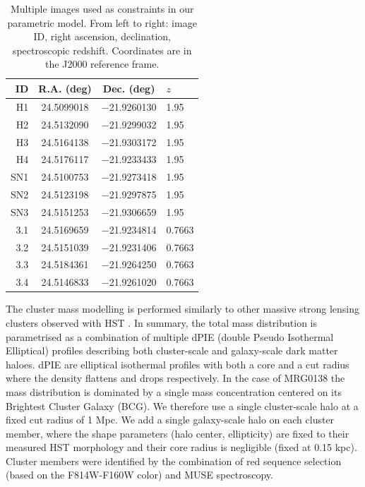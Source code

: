 \documentclass[12pt,dvipsnames]{article}
\begin{document}
\begin{table}[]
    \centering
    \begin{tabular}{rccl}
     ID &   R.A. (deg) & Dec. (deg) & $z$ \\
     \midrule
H1 & 24.5099018 & $-$21.9260130 & 1.95 \\
H2 & 24.5132090 & $-$21.9299032 & 1.95 \\
H3 & 24.5164138 & $-$21.9303172 & 1.95 \\
H4 & 24.5176117 & $-$21.9233433 & 1.95 \\
SN1 & 24.5100753 & $-$21.9273418 & 1.95 \\
SN2 & 24.5123198 & $-$21.9297875 & 1.95 \\
SN3 & 24.5151253 & $-$21.9306659 & 1.95 \\
3.1 & 24.5169659 & $-$21.9234814 & 0.7663 \\
3.2 & 24.5151039 & $-$21.9231406 & 0.7663 \\
3.3 & 24.5184361 & $-$21.9264250 & 0.7663 \\
3.4 & 24.5146833 & $-$21.9261020 & 0.7663 \\
    \end{tabular}
    \caption{Multiple images used as constraints in our parametric model. From left to right: image ID, right ascension, declination, spectroscopic redshift.  Coordinates are in the J2000 reference frame.}
    \label{tab:mulimages}
\end{table}

The cluster mass modelling is performed similarly to other massive strong lensing clusters observed with HST \cite{richard_mass_2014}. In summary, the total mass distribution is parametrised as a combination of multiple dPIE (double Pseudo Isothermal Elliptical) profiles describing both cluster-scale and galaxy-scale dark matter haloes. dPIE are elliptical isothermal profiles with both a core and a cut radius where the density flattens and drops respectively. In the case of MRG0138 the mass distribution is dominated by a single mass concentration centered on its Brightest Cluster Galaxy (BCG). We therefore use a single cluster-scale halo at a fixed cut radius of 1 Mpc.  We add a single galaxy-scale halo on each cluster member, where the shape parameters (halo center, ellipticity) are fixed to their measured HST morphology and their core radius is negligible (fixed at 0.15 kpc). Cluster members were identified by the combination of red sequence selection (based on the F814W-F160W color) and MUSE spectroscopy.
\end{document}
